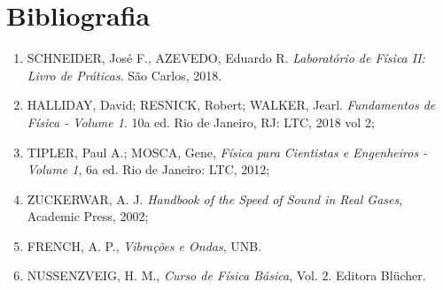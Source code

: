 \newpage
\section{Bibliografia}

\begin{enumerate}
  \item SCHNEIDER, José F., AZEVEDO, Eduardo R. \textit{Laboratório de Física II: Livro de Práticas}. São Carlos, 2018.
  \item HALLIDAY, David; RESNICK, Robert; WALKER, Jearl. \textit{Fundamentos de Física - Volume 1}. 10a ed. Rio de Janeiro, RJ: LTC, 2018 vol 2;
  \item TIPLER, Paul A.; MOSCA, Gene, \textit{Física para Cientistas e Engenheiros - Volume 1}, 6a ed. Rio de Janeiro: LTC, 2012;
  \item ZUCKERWAR, A. J. \textit{Handbook of the Speed of Sound in Real Gases}, Academic Press, 2002;
  \item FRENCH, A. P., \textit{Vibrações e Ondas}, UNB.
  \item NUSSENZVEIG, H. M., \textit{Curso de Física Básica}, Vol. 2. Editora Blücher.
\end{enumerate}

